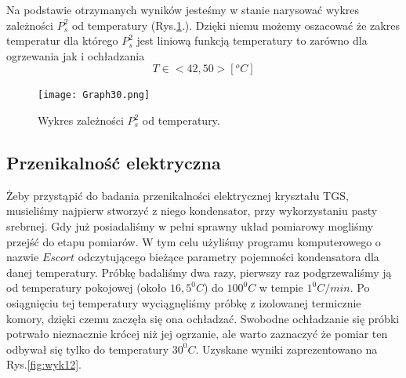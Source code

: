 \documentclass{article}
\begin{document}
Na podstawie otrzymanych wyników jesteśmy w stanie narysować wykres zależności $P_{s}^{2}$ od temperatury (Rys.\ref{fig:Graph30}.). Dzięki niemu możemy oszacować że zakres temperatur dla którego $P_{s}^{2}$ jest liniową funkcją temperatury to zarówno dla ogrzewania jak i ochładzania 
\begin{equation}
T\in <42 , 50 > [^{o}C]
\end{equation}

\begin{figure}[!h]
	\centering
	\texttt{[image: Graph30.png]}
	\caption{Wykres zależności $P_{s}^{2}$ od temperatury.}
	\label{fig:Graph30}
\end{figure}

\newpage
\subsection{Przenikalność elektryczna}
Żeby przystąpić do badania przenikalności elektrycznej kryształu TGS, musieliśmy najpierw stworzyć z niego kondensator, przy wykorzystaniu pasty srebrnej. Gdy już posiadaliśmy w pełni sprawny układ pomiarowy mogliśmy przejść do etapu pomiarów. W tym celu użyliśmy programu komputerowego o nazwie $Escort$ odczytującego bieżące parametry pojemności kondensatora dla danej temperatury. Próbkę badaliśmy dwa razy, pierwszy raz podgrzewaliśmy ją od temperatury pokojowej (około $16,5^{0}C$) do $100^{0}C$ w tempie $1^{0}C/min$. Po osiągnięciu tej temperatury wyciągnęliśmy próbkę z izolowanej termicznie komory, dzięki czemu zaczęła się ona ochładzać. Swobodne ochładzanie się próbki potrwało nieznacznie krócej niż jej ogrzanie, ale warto zaznaczyć że pomiar ten odbywał się tylko do temperatury $30^{0}C$. Uzyskane wyniki zaprezentowano na Rys.\ref{fig:wyk12}.
\end{document}

